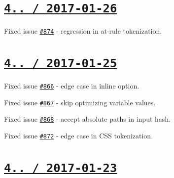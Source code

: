 \section*{\href{https://github.com/jakubpawlowicz/clean-css/compare/v4.0.1...v4.0.2}{\tt 4.. / 2017-\/01-\/26} }


\begin{DoxyItemize}
\item Fixed issue \href{https://github.com/jakubpawlowicz/clean-css/issues/874}{\tt \#874} -\/ regression in at-\/rule tokenization.
\end{DoxyItemize}

\section*{\href{https://github.com/jakubpawlowicz/clean-css/compare/v4.0.0...v4.0.1}{\tt 4.. / 2017-\/01-\/25} }


\begin{DoxyItemize}
\item Fixed issue \href{https://github.com/jakubpawlowicz/clean-css/issues/866}{\tt \#866} -\/ edge case in {\ttfamily inline} option.
\item Fixed issue \href{https://github.com/jakubpawlowicz/clean-css/issues/867}{\tt \#867} -\/ skip optimizing variable values.
\item Fixed issue \href{https://github.com/jakubpawlowicz/clean-css/issues/868}{\tt \#868} -\/ accept absolute paths in input hash.
\item Fixed issue \href{https://github.com/jakubpawlowicz/clean-css/issues/872}{\tt \#872} -\/ edge case in C\+SS tokenization.
\end{DoxyItemize}

\section*{\href{https://github.com/jakubpawlowicz/clean-css/compare/v3.4.24...v4.0.0}{\tt 4.. / 2017-\/01-\/23} }


